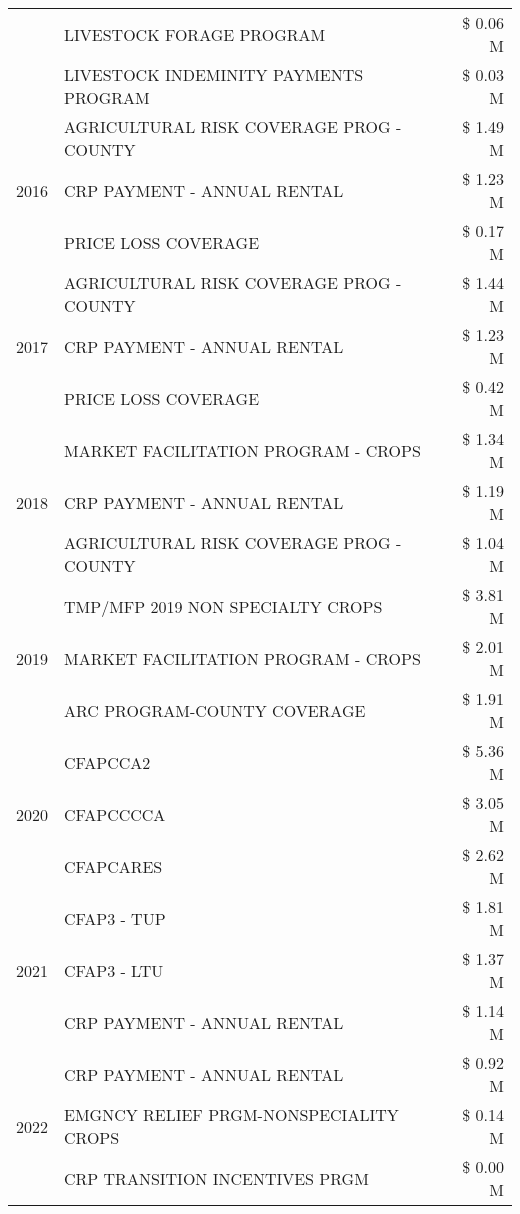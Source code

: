 \begin{tabular}{llr}
 & LIVESTOCK FORAGE PROGRAM & \$ 0.06 M \\
 & LIVESTOCK INDEMINITY PAYMENTS PROGRAM & \$ 0.03 M \\
\cline{1-3}
\multirow[t]{3}{*}{2016} & AGRICULTURAL RISK COVERAGE PROG - COUNTY & \$ 1.49 M \\
 & CRP PAYMENT - ANNUAL RENTAL & \$ 1.23 M \\
 & PRICE LOSS COVERAGE & \$ 0.17 M \\
\cline{1-3}
\multirow[t]{3}{*}{2017} & AGRICULTURAL RISK COVERAGE PROG - COUNTY & \$ 1.44 M \\
 & CRP PAYMENT - ANNUAL RENTAL & \$ 1.23 M \\
 & PRICE LOSS COVERAGE & \$ 0.42 M \\
\cline{1-3}
\multirow[t]{3}{*}{2018} & MARKET FACILITATION PROGRAM - CROPS & \$ 1.34 M \\
 & CRP PAYMENT - ANNUAL RENTAL & \$ 1.19 M \\
 & AGRICULTURAL RISK COVERAGE PROG - COUNTY & \$ 1.04 M \\
\cline{1-3}
\multirow[t]{3}{*}{2019} & TMP/MFP 2019 NON SPECIALTY CROPS & \$ 3.81 M \\
 & MARKET FACILITATION PROGRAM - CROPS & \$ 2.01 M \\
 & ARC PROGRAM-COUNTY COVERAGE & \$ 1.91 M \\
\cline{1-3}
\multirow[t]{3}{*}{2020} & CFAPCCA2 & \$ 5.36 M \\
 & CFAPCCCCA & \$ 3.05 M \\
 & CFAPCARES & \$ 2.62 M \\
\cline{1-3}
\multirow[t]{3}{*}{2021} & CFAP3 - TUP & \$ 1.81 M \\
 & CFAP3 - LTU & \$ 1.37 M \\
 & CRP PAYMENT - ANNUAL RENTAL & \$ 1.14 M \\
\cline{1-3}
\multirow[t]{3}{*}{2022} & CRP PAYMENT - ANNUAL RENTAL & \$ 0.92 M \\
 & EMGNCY RELIEF PRGM-NONSPECIALITY CROPS & \$ 0.14 M \\
 & CRP TRANSITION INCENTIVES PRGM & \$ 0.00 M \\
\cline{1-3}
\bottomrule
\end{tabular}
